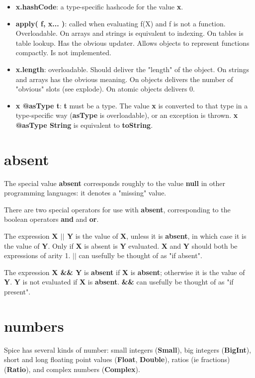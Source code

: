 \documentclass{report}
\begin{document}
\begin{itemize}
\item {\bf x.hashCode}:
    a type-specific hashcode for the value {\bf x}.

\item {\bf apply( f, x... )}:
    called when evaluating f(X) and f is not a function. Overloadable.
    On arrays and strings is equivalent to indexing. On tables is
    table lookup. Has the obvious updater. Allows objects to represent
    functions compactly. Is not implemented.

\item {\bf x.length}:
    overloadable. Should deliver the "length" of the object. On
    strings and arrays has the obvious meaning. On objects delivers
    the number of "obvious" slots (see explode). On atomic objects
    delivers 0.

\item {\bf x @asType t}:
    {\bf t} must be a type. The value {\bf x} is converted to that type in a
    type-specific way ({\bf asType} is overloadable), or an exception is thrown.
    {\bf x @asType String} is equivalent to {\bf toString}.

\end{itemize}\section{absent}


The special value {\bf absent} corresponds roughly to the value {\bf null} in
other programming languages: it denotes a "missing" value.

There are two special operators for use with {\bf absent}, corresponding to the
boolean operators {\bf and} and {\bf or}.

The expression {\bf X $\mid$$\mid$ Y} is the value of {\bf X}, unless it is {\bf absent}, in which
case it is the value of {\bf Y}. Only if {\bf X} is absent is {\bf Y} evaluated. {\bf X} and
{\bf Y} should both be expressions of arity 1. {\bf $\mid$$\mid$} can usefully be thought of
as "if absent".

The expression {\bf X \&\& Y} is {\bf absent} if {\bf X} is {\bf absent}; otherwise it is the
value of {\bf Y}. {\bf Y} is not evaluated if {\bf X} is {\bf absent}. {\bf \&\&} can usefully be
thought of as "if present".\section{numbers}


Spice has several kinds of number: small integers ({\bf Small}), big integers
({\bf BigInt}), short and long floating point values ({\bf Float}, {\bf Double}),
ratios (ie fractions) ({\bf Ratio}), and complex numbers ({\bf Complex}).
\end{document}
